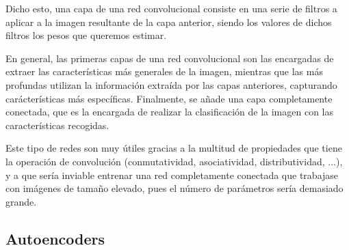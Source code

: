 \documentclass[
  a4paper,
  12pt,
  spanish,
]{scrartcl}
\theoremstyle{teorema-style}
\begin{document}
Dicho esto, una capa de una red convolucional consiste en una serie de filtros a aplicar a la imagen resultante de la capa anterior, siendo los valores de dichos filtros los pesos que queremos estimar.

En general, las primeras capas de una red convolucional son las encargadas de extraer las características más generales de la imagen, mientras que las más profundas utilizan la información extraída por las capas anteriores, capturando carácterísticas más específicas. Finalmente, se añade una capa completamente conectada, que es la encargada de realizar la clasificación de la imagen con las características recogidas.

Este tipo de redes son muy útiles gracias a la multitud de propiedades que tiene la operación de convolución (conmutatividad, asociatividad, distributividad, ...), y a que sería inviable entrenar una red completamente conectada que trabajase con imágenes de tamaño elevado, pues el número de parámetros sería demasiado grande.

\subsection{Autoencoders}
\end{document}
